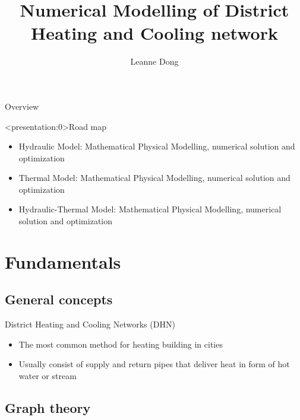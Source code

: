 \documentclass[xcolor=dvipsnames]{beamer}
\title{Numerical Modelling of District Heating and Cooling network}
\author{Leanne Dong}
\begin{document}
\begin{frame}
\titlepage
\end{frame}
\begin{frame}{Overview}
\tableofcontents
\end{frame}


\begin{frame}<presentation:0>{Road map}
	\begin{itemize}
		\item {\color{purple}Hydraulic} Model: Mathematical Physical Modelling, numerical solution and optimization
		\item {\color{purple}Thermal} Model: Mathematical Physical Modelling, numerical solution and optimization
		\item {\color{purple}Hydraulic-Thermal} Model: Mathematical Physical Modelling, numerical solution and optimization
	\end{itemize}
\end{frame}
\section{Fundamentals}

\subsection{General concepts}
\begin{frame}{District Heating and Cooling Networks (DHN)}
\begin{itemize}
	\item The most common method for heating building in cities
	\item Usually consist of supply and return pipes that deliver heat in form of hot water or stream
\end{itemize}
\end{frame}

\subsection{Graph theory}
\end{document}
